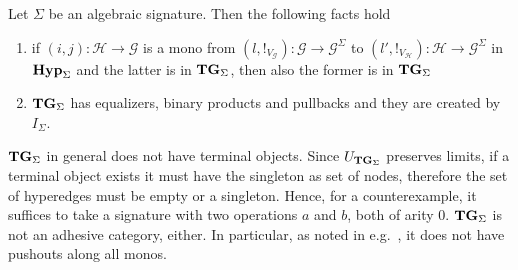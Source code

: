 \documentclass[3p]{elsarticle}
\newcommand{\Set}{\mathbf{Set}}
\newcommand{\catname}[1]{\textbf{\textup{#1}}}
\newcommand{\hyp}{\catname{Hyp}}
\newcommand{\tg}[0]{\catname{TG}_{\Sigma}}
\theoremstyle{remark}
\theoremstyle{definition}
\begin{document}
\begin{prop}\label{prop:tlim}
Let $\Sigma$ be an algebraic signature. Then the following facts hold
\begin{enumerate}
	\item if  $(i,j)\colon \mathcal{H}\to \mathcal{G}$ is a mono from $(l, !_{V_\mathcal{G}})\colon \mathcal{G}\to \mathcal{G}^{\Sigma}$ to $(l', !_{V_\mathcal{H}})\colon \mathcal{H}\to \mathcal{G}^{\Sigma}$ in $\hyp_\Sigma$ and the latter is in $\tg$, then also the former is in $\tg$
	\item $\tg$ has equalizers, binary products and pullbacks and they are created by $I_\Sigma$.
\end{enumerate}
\end{prop}

\begin{rem}
	$\tg$ in general does not have terminal objects. 
	Since $U_{\tg}$ preserves limits, if a terminal object exists it must have the singleton as set of nodes, therefore the set of hyperedges must be empty or a singleton. 
	Hence, for a counterexample, it suffices to take a signature with two operations $a$ and $b$, both of arity $0$.
	$\tg$ is not an adhesive category, either. 
	In particular, as noted in e.g.~\cite{CastelnovoGM24}, 
	 it does not have pushouts along all monos. 
\end{rem}
	
\end{document}
